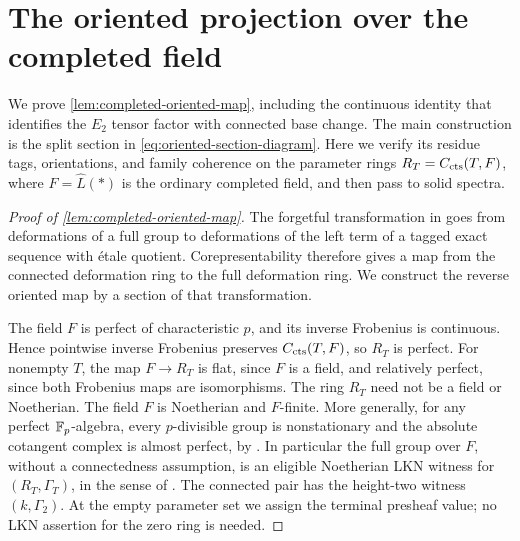 \section{The oriented projection over the completed field}
\label{app:oriented-projection}

We prove \cref{lem:completed-oriented-map}, including the continuous
identity that identifies the \(E_2\) tensor factor with connected base
change. The main construction is the split section in
\eqref{eq:oriented-section-diagram}. Here we verify its residue tags,
orientations, and family coherence on the parameter rings
\(R_T=C_{\mathrm{cts}}(T,F)\), where \(F=\widehat L(*)\) is the ordinary
completed field, and then pass to solid spectra.

\begin{proof}[Proof of \cref{lem:completed-oriented-map}]
The forgetful transformation in
\cite[Proposition~6.2.2 and Remark~6.2.3]{LurieEllipticII2018} goes from
deformations of a full group to deformations of the left term of a tagged
exact sequence with étale quotient. Corepresentability therefore gives a
map from the connected deformation ring to the full deformation ring.
We construct the reverse oriented map by a section of that transformation.

The field \(F\) is perfect of characteristic \(p\), and its inverse
Frobenius is continuous. Hence pointwise inverse Frobenius preserves
\(C_{\mathrm{cts}}(T,F)\), so \(R_T\) is perfect. For nonempty \(T\), the map
\(F\to R_T\) is flat, since \(F\) is a field, and relatively perfect, since
both Frobenius maps are isomorphisms. The ring \(R_T\) need not be a field
or Noetherian. The field \(F\) is Noetherian and \(F\)-finite.
More generally, for any perfect \(\mathbb F_p\)-algebra, every \(p\)-divisible group is nonstationary
and the absolute cotangent complex is almost perfect, by
\cite[Remark~3.4.2]{LurieEllipticII2018}. In particular the full group
over \(F\), without a connectedness assumption, is an eligible
Noetherian LKN witness for \((R_T,\Gamma_T)\), in the sense of
\cite[Definition~4.3.7 and Example~4.6.4]{BMR2026}. The connected pair has
the height-two witness \((k,\Gamma_2)\). At the empty parameter set we
assign the terminal presheaf value; no LKN assertion for the zero ring is
needed.


\end{proof}
